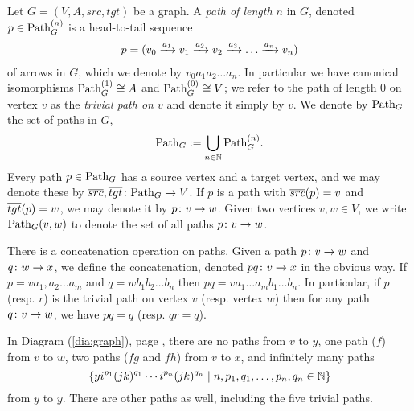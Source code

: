 \documentclass[CT4S-EN-RU]{subfiles}
\begin{document}
\begin{definitionENG}\label{def:paths in graph}
Let $G=(V,A,src,tgt)$ be a graph. A {\em path of length $n$} in $G$, denoted $p\in\textnormal{Path}_G^{(n)}$ is a head-to-tail sequence \begin{align}\label{dia:path}p=(v_0\xrightarrow{a_1}v_1\xrightarrow{a_2}v_2\xrightarrow{a_3}\ldots\xrightarrow{a_n}v_n)\end{align} of arrows in $G$, which we denote by $v_0 a_1 a_2 \ldots a_n$. In particular we have canonical isomorphisms $\textnormal{Path}_G^{(1)}\cong A$ and $\textnormal{Path}_G^{(0)}\cong V$; we refer to the path of length 0 on vertex $v$ as the {\em trivial path on $v$} and denote it simply by $v$. We denote by $\textnormal{Path}_G$ the set of paths in $G$, $$\textnormal{Path}_G:=\bigcup_{n\in{\mathbb N}}\textnormal{Path}_G^{(n)}.$$ Every path $p\in\textnormal{Path}_G$ has a source vertex and a target vertex, and we may denote these by $\overline{src},\overline{tgt}\colon\textnormal{Path}_G\rightarrow V$. If $p$ is a path with $\overline{src}(p)=v$ and $\overline{tgt}(p)=w$, we may denote it by $p\colon v\rightarrow w$. Given two vertices $v,w\in V$, we write $\textnormal{Path}_G(v,w)$ to denote the set of all paths $p\colon v\rightarrow w$.

There is a concatenation operation on paths. Given a path $p\colon v\rightarrow w$ and $q\colon w\rightarrow x$, we define the concatenation, denoted $p q\colon v\rightarrow x$ in the obvious way. If $p=va_1,a_2\ldots a_m$ and $q= wb_1b_2\ldots b_n$ then $pq=va_1\ldots a_mb_1\ldots b_n.$ In particular, if $p$ (resp. $r$) is the trivial path on vertex $v$ (resp. vertex $w$) then for any path $q\colon v\rightarrow w$, we have $pq=q$ (resp. $qr=q$). 
\end{definitionENG}

\begin{definitionRUS}\label{def:paths in graph}
\end{definitionRUS}

\begin{exampleENG}
In Diagram (\ref{dia:graph}), page \pageref{dia:graph}, there are no paths from $v$ to $y$, one path ($f$) from $v$ to $w$, two paths ($fg$ and $fh$) from $v$ to $x$, and infinitely many paths $$\{y i^{p_1}(jk)^{q_1}\cdots i^{p_n}(jk)^{q_n}\;|\;n,p_1,q_1,\ldots,p_n,q_n\in{\mathbb N}\}$$ from $y$ to $y$. There are other paths as well, including the five trivial paths.
\end{exampleENG}

\begin{exampleRUS}
\end{exampleRUS}
\end{document}
